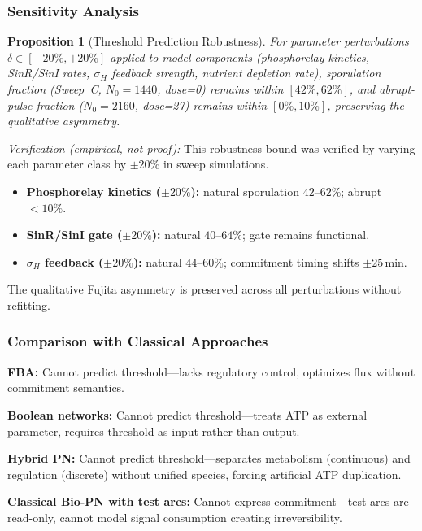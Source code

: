 \documentclass[10pt,letterpaper]{article}
\newtheorem{proposition}{Proposition}
\begin{document}
\subsubsection{Sensitivity Analysis}

\begin{proposition}[Threshold Prediction Robustness]
For parameter perturbations $\delta \in [-20\%, +20\%]$ applied to model components (phosphorelay kinetics, SinR/SinI rates, $\sigma_H$ feedback strength, nutrient depletion rate), sporulation fraction (Sweep~C, $N_0=1440$, dose=0) remains within $[42\%, 62\%]$, and abrupt-pulse fraction ($N_0=2160$, dose=27) remains within $[0\%, 10\%]$, preserving the qualitative asymmetry.
\end{proposition}

\noindent\textit{Verification (empirical, not proof):} This robustness bound was verified by varying each parameter class by $\pm20\%$ in sweep simulations.
\begin{itemize}
\item \textbf{Phosphorelay kinetics ($\pm20\%$):} natural sporulation $42\text{--}62\%$; abrupt $< 10\%$.
\item \textbf{SinR/SinI gate ($\pm20\%$):} natural $40\text{--}64\%$; gate remains functional.
\item \textbf{$\sigma_H$ feedback ($\pm20\%$):} natural $44\text{--}60\%$; commitment timing shifts $\pm 25\,$min.
\end{itemize}
The qualitative Fujita asymmetry is preserved across all perturbations without refitting.

\subsubsection{Comparison with Classical Approaches}

\textbf{FBA:} Cannot predict threshold---lacks regulatory control, optimizes flux without commitment semantics.

\textbf{Boolean networks:} Cannot predict threshold---treats ATP as external parameter, requires threshold as input rather than output.

\textbf{Hybrid PN:} Cannot predict threshold---separates metabolism (continuous) and regulation (discrete) without unified species, forcing artificial ATP duplication.

\textbf{Classical Bio-PN with test arcs:} Cannot express commitment---test arcs are read-only, cannot model signal consumption creating irreversibility.
\end{document}
